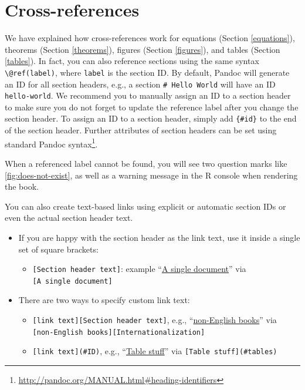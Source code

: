\documentclass[
  12pt,
]{krantz}
\providecommand{\tightlist}{%
  \setlength{\itemsep}{0pt}\setlength{\parskip}{0pt}}
\renewcommand{\href}[2]{#2\footnote{\url{#1}}}
\theoremstyle{definition}
\theoremstyle{definition}
\theoremstyle{definition}
\theoremstyle{definition}
\theoremstyle{remark}
\begin{document}
\hypertarget{cross-references}{%
\section{Cross-references}\label{cross-references}}

We have explained how cross-references work for equations (Section \ref{equations}), theorems (Section \ref{theorems}), figures (Section \ref{figures}), and tables (Section \ref{tables}). In fact, you can also reference sections using the same syntax \texttt{\textbackslash{}@ref(label)}, where \texttt{label} is the section ID. By default, Pandoc will generate an ID for all section headers, e.g., a section \texttt{\#\ Hello\ World} will have an ID \texttt{hello-world}. We recommend you to manually assign an ID to a section header to make sure you do not forget to update the reference label after you change the section header. To assign an ID to a section header, simply add \texttt{\{\#id\}} to the end of the section header. Further attributes of section headers can be set using standard \href{http://pandoc.org/MANUAL.html\#heading-identifiers}{Pandoc syntax}.

When a referenced label cannot be found, you will see two question marks like \ref{fig:does-not-exist}, as well as a warning message in the R console when rendering the book.

You can also create text-based links using explicit or automatic section IDs or even the actual section header text.

\begin{itemize}
\tightlist
\item
  If you are happy with the section header as the link text, use it inside a single set of square brackets:

  \begin{itemize}
  \tightlist
  \item
    \texttt{{[}Section\ header\ text{]}}: example ``\protect\hyperlink{a-single-document}{A single document}'' via \texttt{{[}A\ single\ document{]}}
  \end{itemize}
\item
  There are two ways to specify custom link text:

  \begin{itemize}
  \tightlist
  \item
    \texttt{{[}link\ text{]}{[}Section\ header\ text{]}}, e.g., ``\protect\hyperlink{internationalization}{non-English books}'' via \texttt{{[}non-English\ books{]}{[}Internationalization{]}}
  \item
    \texttt{{[}link\ text{]}(\#ID)}, e.g., ``\protect\hyperlink{tables}{Table stuff}'' via \texttt{{[}Table\ stuff{]}(\#tables)}
  \end{itemize}
\end{itemize}
\end{document}
